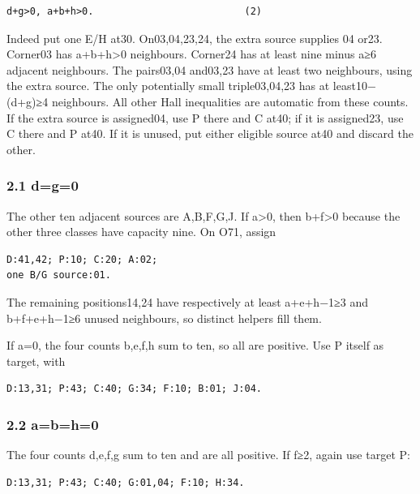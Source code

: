\documentclass[
  10pt,
]{article}
\begin{document}
\begin{verbatim}
d+g>0, a+b+h>0.                          (2)
\end{verbatim}

Indeed put one E/H at30. On03,04,23,24, the extra source supplies 04
or23. Corner03 has a+b+h\textgreater0 neighbours. Corner24 has at least
nine minus a≥6 adjacent neighbours. The pairs03,04 and03,23 have at
least two neighbours, using the extra source. The only potentially small
triple03,04,23 has at least10−(d+g)≥4 neighbours. All other Hall
inequalities are automatic from these counts. If the extra source is
assigned04, use P there and C at40; if it is assigned23, use C there and
P at40. If it is unused, put either eligible source at40 and discard the
other.

\hypertarget{dg0-1}{%
\subsubsection*{2.1 d=g=0}\label{dg0-1}}

The other ten adjacent sources are A,B,F,G,J. If a\textgreater0, then
b+f\textgreater0 because the other three classes have capacity nine. On
O71, assign

\begin{verbatim}
D:41,42; P:10; C:20; A:02;
one B/G source:01.
\end{verbatim}

The remaining positions14,24 have respectively at least a+e+h−1≥3 and
b+f+e+h−1≥6 unused neighbours, so distinct helpers fill them.

If a=0, the four counts b,e,f,h sum to ten, so all are positive. Use P
itself as target, with

\begin{verbatim}
D:13,31; P:43; C:40; G:34; F:10; B:01; J:04.
\end{verbatim}

\hypertarget{abh0-1}{%
\subsubsection*{2.2 a=b=h=0}\label{abh0-1}}

The four counts d,e,f,g sum to ten and are all positive. If f≥2, again
use target P:

\begin{verbatim}
D:13,31; P:43; C:40; G:01,04; F:10; H:34.
\end{verbatim}
\end{document}
